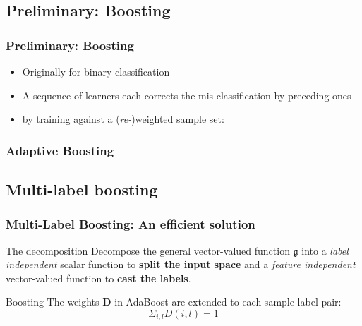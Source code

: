 \documentclass{beamer}
\begin{document}
\subsection{Preliminary: Boosting}

\begin{frame}
\frametitle{Preliminary: Boosting}
\begin{itemize}
\item Originally for binary classification
\item A sequence of learners each corrects the mis-classification by preceding ones
\item by training against a (\textit{re-})weighted sample set:
\end{itemize}
\end{frame}

\begin{frame}
\frametitle{Adaptive Boosting}

\begin{algorithm}[H]
\end{algorithm}

\end{frame}

\subsection{Multi-label boosting}

\begin{frame}
\frametitle{Multi-Label Boosting: An efficient solution}
\begin{block}{The decomposition}
  Decompose the general vector-valued function $\mathfrak{g}$ into a \textit{label independent} scalar function to \textbf{split the input space} and a \textit{feature independent} vector-valued function to \textbf{cast the labels}.
\end{block}

\begin{block}{Boosting}
The weights $\mathbf{D}$ in AdaBoost are extended to each sample-label pair:
$${\Sigma}_{i,l} D(i, l) = 1$$
\end{block}

\end{frame}
\end{document}

